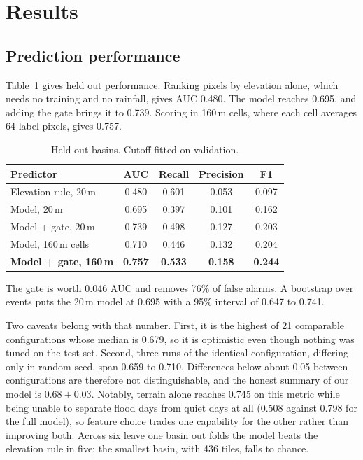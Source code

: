 \documentclass[10pt,conference]{IEEEtran}
\begin{document}
\section{Results}

\subsection{Prediction performance}
Table~\ref{tab:main} gives held out performance. Ranking pixels by elevation
alone, which needs no training and no rainfall, gives AUC 0.480. The model
reaches 0.695, and adding the gate brings it to 0.739. Scoring in 160\,m cells,
where each cell averages 64 label pixels, gives 0.757.

\begin{table}[t]
\caption{Held out basins. Cutoff fitted on validation.}
\label{tab:main}
\centering
\begin{tabular}{lcccc}
\toprule
Predictor & AUC & Recall & Precision & F1 \\
\midrule
Elevation rule, 20\,m          & 0.480 & 0.601 & 0.053 & 0.097 \\
Model, 20\,m                   & 0.695 & 0.397 & 0.101 & 0.162 \\
Model + gate, 20\,m            & 0.739 & 0.498 & 0.127 & 0.203 \\
Model, 160\,m cells            & 0.710 & 0.446 & 0.132 & 0.204 \\
\textbf{Model + gate, 160\,m}  & \textbf{0.757} & \textbf{0.533} & \textbf{0.158} & \textbf{0.244} \\
\bottomrule
\end{tabular}
\end{table}

The gate is worth 0.046 AUC and removes 76\% of false alarms. A bootstrap over
events puts the 20\,m model at 0.695 with a 95\% interval of 0.647 to 0.741.

Two caveats belong with that number. First, it is the highest of 21 comparable
configurations whose median is 0.679, so it is optimistic even though nothing
was tuned on the test set. Second, three runs of the identical configuration,
differing only in random seed, span 0.659 to 0.710. Differences below about 0.05
between configurations are therefore not distinguishable, and the honest summary
of our model is $0.68 \pm 0.03$. Notably, terrain alone reaches 0.745 on this
metric while being unable to separate flood days from quiet days at all (0.508
against 0.798 for the full model), so feature choice trades one capability for
the other rather than improving both.
Across six leave one basin out folds the model beats the elevation rule in five;
the smallest basin, with 436 tiles, falls to chance.
\end{document}
